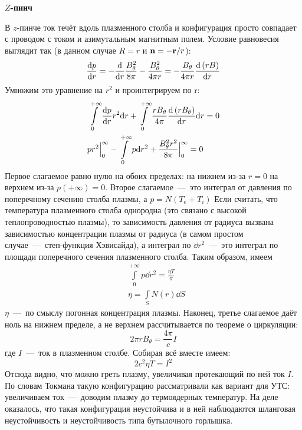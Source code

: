 \documentclass[10pt, a4paper]{article}
\begin{document}
\vspace{5mm}
\textbf{$Z$-пинч}

В $z$-пинче ток течёт вдоль плазменного столба и конфигурация просто совпадает с проводом с током и азимутальным магнитным полем. Условие равновесия выглядит так (в данном случае $R=r$ и $\vb{n}=-\vb{r}/r$):
\begin{equation*}
	\dv{p}{r} = -\dv{}{r}\frac{B_\theta^2}{8\pi} - \frac{B_\theta^2}{4\pi r} = -\frac{B_\theta}{4\pi r}\dv{\left( rB \right)}{r}
\end{equation*}
Умножим это уравнение на $r^2$ и проинтегрируем по r:
\begin{align*}
	&\int\limits_0^{+\infty}\dv{p}{r}r^2\dd r + \int\limits_0^{+\infty}\frac{rB_\theta}{4\pi}\dv{\left( rB_\theta \right)}{r}\dd r = 0 \\
	&pr^2\Big\rvert_0^{\infty} - \int\limits_0^{+\infty}p\dd r^2  + \frac{B_\theta^2 r^2}{8\pi}\Big\rvert_0^{\infty} = 0
\end{align*}
Первое слагаемое равно нулю на обоих пределах: на нижнем из-за $r=0$ на верхнем из-за $p(+\infty)=0$. Второе слагаемое~---~это интеграл от давления по поперечному сечению столба плазмы, а $p=N(T_e+T_i)$ Если считать, что температура плазменного столба однородна (это связано с высокой теплопроводностью плазмы), то зависимость давления от радиуса вызвана зависимостью концентрации плазмы от радиуса (в самом простом случае~---~степ-функция Хэвисайда), а интеграл по $\dd r^2$~---~это интеграл по площади поперечного сечения плазменного столба. Таким образом, имеем
\begin{align*}
	&\int\limits_0^{+\infty}p\dd r^2 = \frac{\eta T}{\pi} \\
	&\eta = \int\limits_SN(r)\dd S
\end{align*}
$\eta$~---~по смыслу погонная концентрация плазмы.
Наконец, третье слагаемое даёт ноль на нижнем пределе, а не верхнем рассчитывается по теореме о циркуляции:
\begin{equation*}
	2\pi r B_\theta = \frac{4\pi}{c}I
\end{equation*}
где $I$~---~ток в плазменном столбе.
Собирая всё вместе имеем:
\begin{equation*}
	2c^2 \eta T = I^2
\end{equation*}
Отсюда видно, что можно греть плазму, увеличивая протекающий по ней ток $I$. По словам Токмана такую конфигурацию рассматривали как вариант для УТС: увеличиваем ток~---~доводим плазму до термоядерных температур. На деле оказалось, что такая конфигурация неустойчива и в ней наблюдаются шланговая неустойчивость и неустойчивость типа бутылочного горлышка.
\end{document}
